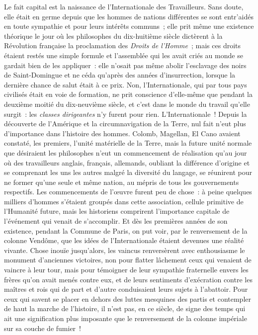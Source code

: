 \documentclass[french,twoside]{book} %
\begin{document}
Le fait capital est la naissance de l’Internationale des Travailleurs. Sans doute, elle était en germe depuis que les hommes de nations différentes se sont entr’aidés en toute sympathie et pour leurs intérêts communs ; elle prit  même une existence théorique le jour où les philosophes du dix-huitième siècle dictèrent à la Révolution française la proclamation des \emph{Droits de l’Homme} ; mais ces droits étaient restés une simple formule et l’assemblée qui les avait criés au monde se gardait bien de les appliquer : elle n’osait pas même abolir l’esclavage des noirs de Saint-Domingue et ne céda qu’après des années d’insurrection, lorsque la dernière chance de salut était à ce prix. Non, l’Internationale, qui par tous pays civilisés était en voie de formation, ne prit conscience d’elle-même que pendant la deuxième moitié du dix-neuvième siècle, et c’est dans le monde du travail qu’elle surgit : les \emph{classes dirigeantes} n’y furent pour rien. L’Internationale ! Depuis  la découverte de l’Amérique et la circumnavigation de la Terre, nul fait n’eut plus d’importance dans l’histoire des hommes. Colomb, Magellan, El Cano avaient constaté, les premiers, l’unité matérielle de la Terre, mais la future unité normale que désiraient les philosophes n’eut un commencement de réalisation qu’au jour où des travailleurs anglais, français, allemands, oubliant la différence d’origine et se comprenant les uns les autres malgré la diversité du langage, se réunirent pour ne former qu’une seule et même nation, au mépris de tous les gouvernements respectifs. Les commencements de l’œuvre furent peu de chose : à peine quelques milliers d’hommes s’étaient groupés dans cette association, cellule primitive  de l’Humanité future, mais les historiens comprirent l’importance capitale de l’événement qui venait de s’accomplir. Et dès les premières années de son existence, pendant la Commune de Paris, on put voir, par le renversement de la colonne Vendôme, que les idées de l’Internationale étaient devenues une réalité vivante. Chose inouïe jusqu’alors, les vaincus renversèrent avec enthousiasme le monument d’anciennes victoires, non pour flatter lâchement ceux qui venaient de vaincre à leur tour, mais pour témoigner de leur sympathie fraternelle envers les frères qu’on avait menés contre eux, et de leurs sentiments d’exécration contre les maîtres et rois qui de part et d’autre conduisaient leurs sujets à l’abattoir. Pour ceux qui savent se  placer en dehors des luttes mesquines des partis et contempler de haut la marche de l’histoire, il n’est pas, en ce siècle, de signe des temps qui ait une signification plus imposante que le renversement de la colonne impériale sur sa couche de fumier !\par
\end{document}
